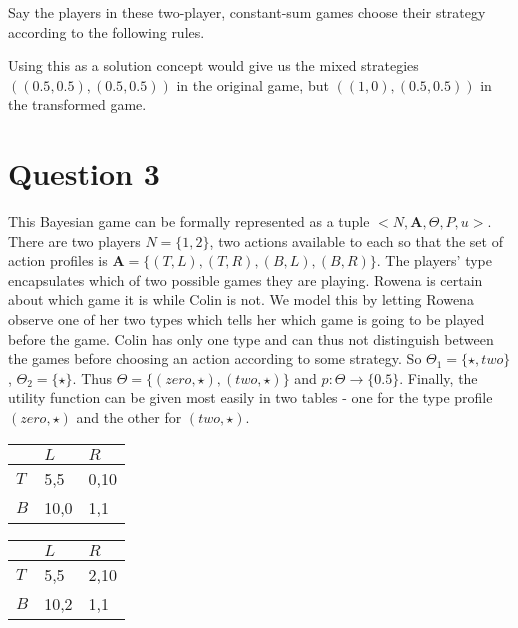 \documentclass[10pt,a4paper]{article}
\begin{document}
\noindent Say the players in these two-player, constant-sum games choose their strategy according to the following rules.


\noindent Using this as a solution concept would give us the mixed strategies $((0.5,0.5),(0.5,0.5))$ in the original game, but $((1,0),(0.5,0.5))$ in the transformed game.

\section*{Question 3}
This Bayesian game can be formally represented as a tuple $<N,\boldsymbol{A}, \Theta, P, u>$. There are two players $N=\{1,2\}$, two actions available to each so that the set of action profiles is $\boldsymbol{A}=\{(T,L),(T,R),(B,L),(B,R)\}$. The players' type encapsulates which of two possible games they are playing. Rowena is certain about which game it is while Colin is not. We model this by letting Rowena observe one of her two types which tells her which game is going to be played before the game. Colin has only one type and can thus not distinguish between the games before choosing an action according to some strategy. So $\Theta_1=\{\star, two\}$, $\Theta_2=\{\star\}$. Thus $\Theta=\{(zero,\star),(two,\star)\}$ and $p: \Theta \rightarrow \{0.5\}$. Finally, the utility function can be given most easily in two tables - one for the type profile $(zero,\star)$ and the other for $(two,\star)$.
\begin{table}[H]
\centering
\begin{tabular}[l]{|l|l|l|}
\hline
          & $L$ & $R$  \\ \hline
$T$     & 5,5   & 0,10 \\ \hline
$B$		& 10,0	& 1,1 \\ \hline
\end{tabular}
\quad
\begin{tabular}[r]{|l|l|l|}
\hline
          & $L$ & $R$  \\ \hline
$T$     & 5,5   & 2,10 \\ \hline
$B$		& 10,2	& 1,1 \\ \hline
\end{tabular}
\end{table}
\end{document}
